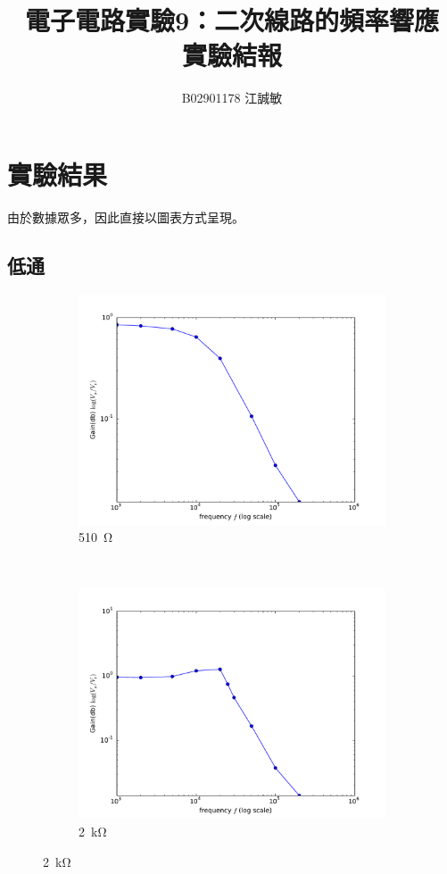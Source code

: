 \documentclass[12pt, a4paper]{article}
\title{ \bf {\Huge 電子電路實驗9：二次線路的頻率響應}\\ 實驗結報}
\author{B02901178 江誠敏}
\begin{document}
\maketitle


\section{實驗結果}
由於數據眾多，因此直接以圖表方式呈現。
\subsection{低通}
\begin{figure}[H]
  \centering
  \begin{subfigure}[b]{0.45\textwidth}
    \includegraphics[width=1\textwidth]{data/img/q1.pdf}
    \caption{\SI{510}\ohm}
  \end{subfigure}
  ~
  \begin{subfigure}[b]{0.45\textwidth}
    \includegraphics[width=1\textwidth]{data/img/q2.pdf}
    \caption{\SI{2}\kohm}
  \end{subfigure}
\end{figure}
\end{document}
